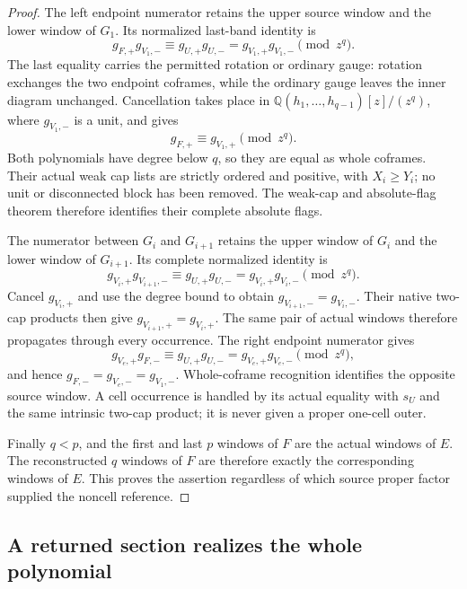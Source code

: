 \documentclass[11pt,a4paper]{amsart}
\numberwithin{equation}{section}
\theoremstyle{plain}
\theoremstyle{definition}
\newcommand{\Q}{\mathbb Q}
\begin{document}
\begin{proof}
The left endpoint numerator retains the upper source window and
the lower window of \(G_1\).  Its normalized last-band identity is
\[
 g_{F,+}g_{V_1,-}
   \equiv g_{U,+}g_{U,-}
   =g_{V_1,+}g_{V_1,-}\pmod{z^q}.
\]
The last equality carries the permitted rotation or ordinary gauge:
rotation exchanges the two endpoint coframes, while the ordinary
gauge leaves the inner diagram unchanged.
Cancellation takes place in
\(\Q(h_1,\ldots,h_{q-1})[z]/(z^q)\), where \(g_{V_1,-}\) is a unit,
and gives
\[
 g_{F,+}\equiv g_{V_1,+}\pmod{z^q}.
\]
Both polynomials have degree below \(q\), so they are equal as whole
coframes.  Their actual weak cap lists are strictly ordered and positive,
with \(X_i\ge Y_i\); no unit or disconnected block has been removed.
The weak-cap and absolute-flag theorem
\cite{Shields2026Coframes} therefore identifies their complete absolute flags.

The numerator between \(G_i\) and \(G_{i+1}\) retains the upper
window of \(G_i\) and the lower window of \(G_{i+1}\).  Its complete
normalized identity is
\[
 g_{V_i,+}g_{V_{i+1},-}
   \equiv g_{U,+}g_{U,-}
   =g_{V_i,+}g_{V_i,-}\pmod{z^q}.
\]
Cancel \(g_{V_i,+}\) and use the degree bound to obtain
\(g_{V_{i+1},-}=g_{V_i,-}\).  Their native two-cap products then give
\(g_{V_{i+1},+}=g_{V_i,+}\).  The same pair of actual windows
therefore propagates through every occurrence.
The right endpoint numerator gives
\[
 g_{V_e,+}g_{F,-}
   \equiv g_{U,+}g_{U,-}
   =g_{V_e,+}g_{V_e,-}\pmod{z^q},
\]
and hence \(g_{F,-}=g_{V_e,-}=g_{V_1,-}\).
Whole-coframe recognition identifies the opposite source window.
A cell occurrence is
handled by its actual equality with \(s_U\) and the same intrinsic two-cap
product; it is never given a proper one-cell outer.

Finally \(q<p\), and the first and last \(p\) windows of \(F\) are the actual
windows of \(E\).  The reconstructed \(q\) windows of \(F\) are therefore exactly
the corresponding windows of \(E\).  This proves the assertion regardless
of which source proper factor supplied the noncell reference.
\end{proof}

\subsection{A returned section realizes the whole polynomial}
\end{document}
